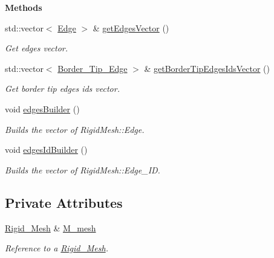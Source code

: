 \begin{Indent}{\bf Methods}\par
\begin{DoxyCompactItemize}
\item 
std\+::vector$<$ \hyperlink{classFVCode3D_1_1ProxyRigidMesh_a15817669a6e426610648e6b5c9df3773}{Edge} $>$ \& \hyperlink{classFVCode3D_1_1ProxyRigidMesh_aa4fb51128e9fad15a93814247dbd6e63}{get\+Edges\+Vector} ()
\begin{DoxyCompactList}\small\item\em Get edges vector. \end{DoxyCompactList}\item 
std\+::vector$<$ \hyperlink{classFVCode3D_1_1ProxyRigidMesh_ac258bca2012a705cb98f8b5038df0ced}{Border\+\_\+\+Tip\+\_\+\+Edge} $>$ \& \hyperlink{classFVCode3D_1_1ProxyRigidMesh_a8dc75dd40ce83562376bf54b8a7cb45c}{get\+Border\+Tip\+Edges\+Ids\+Vector} ()
\begin{DoxyCompactList}\small\item\em Get border tip edges ids vector. \end{DoxyCompactList}\item 
void \hyperlink{classFVCode3D_1_1ProxyRigidMesh_a6dca9c84a22434e595a3f0f69346474d}{edges\+Builder} ()
\begin{DoxyCompactList}\small\item\em Builds the vector of Rigid\+Mesh\+::\+Edge. \end{DoxyCompactList}\item 
void \hyperlink{classFVCode3D_1_1ProxyRigidMesh_abe43d7d836af41c1b8cdc18cd07d9068}{edges\+Id\+Builder} ()
\begin{DoxyCompactList}\small\item\em Builds the vector of Rigid\+Mesh\+::\+Edge\+\_\+\+ID. \end{DoxyCompactList}\end{DoxyCompactItemize}
\end{Indent}
\subsection*{Private Attributes}
\begin{DoxyCompactItemize}
\item 
\hyperlink{classFVCode3D_1_1Rigid__Mesh}{Rigid\+\_\+\+Mesh} \& \hyperlink{classFVCode3D_1_1ProxyRigidMesh_a4f2b91a915de9b510d4897df2583bfe1}{M\+\_\+mesh}
\begin{DoxyCompactList}\small\item\em Reference to a \hyperlink{classFVCode3D_1_1Rigid__Mesh}{Rigid\+\_\+\+Mesh}. \end{DoxyCompactList}\end{DoxyCompactItemize}



